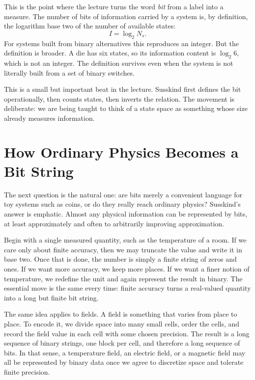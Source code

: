 This is the point where the lecture turns the word \emph{bit} from a label into a measure. The number of bits of information carried by a system is, by definition, the logarithm base two of the number of available states:
\begin{equation}
I=\log_2 N_s.
\end{equation}
For systems built from binary alternatives this reproduces an integer. But the definition is broader. A die has six states, so its information content is \(\log_2 6\), which is not an integer. The definition survives even when the system is not literally built from a set of binary switches.

This is a small but important beat in the lecture. Susskind first defines the bit operationally, then counts states, then inverts the relation. The movement is deliberate: we are being taught to think of a state space as something whose size already measures information.

\section{How Ordinary Physics Becomes a Bit String}

The next question is the natural one: are bits merely a convenient language for toy systems such as coins, or do they really reach ordinary physics? Susskind's answer is emphatic. Almost any physical information can be represented by bits, at least approximately and often to arbitrarily improving approximation.

Begin with a single measured quantity, such as the temperature of a room. If we care only about finite accuracy, then we may truncate the value and write it in base two. Once that is done, the number is simply a finite string of zeros and ones. If we want more accuracy, we keep more places. If we want a finer notion of temperature, we redefine the unit and again represent the result in binary. The essential move is the same every time: finite accuracy turns a real-valued quantity into a long but finite bit string.

The same idea applies to fields. A field is something that varies from place to place. To encode it, we divide space into many small cells, order the cells, and record the field value in each cell with some chosen precision. The result is a long sequence of binary strings, one block per cell, and therefore a long sequence of bits. In that sense, a temperature field, an electric field, or a magnetic field may all be represented by binary data once we agree to discretize space and tolerate finite precision.

